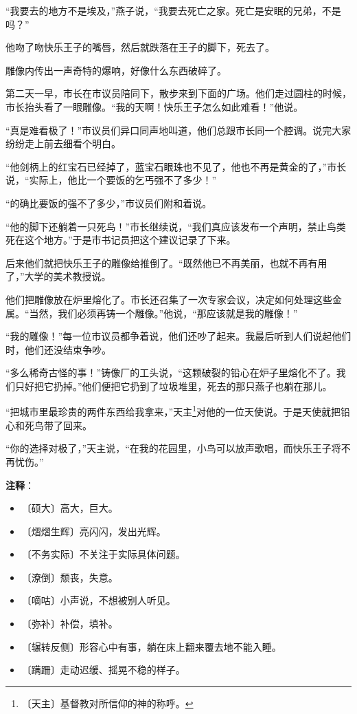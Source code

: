 \documentclass[12pt,UTF-8,openany]{ctexbook}
\begin{document}
\begin{large}
    “我要去的地方不是埃及，”燕子说，“我要去死亡之家。死亡是安眠的兄弟，不是吗？”
    
    他吻了吻快乐王子的嘴唇，然后就跌落在王子的脚下，死去了。
    
    雕像内传出一声奇特的爆响，好像什么东西破碎了。
    
    第二天一早，市长在市议员陪同下，散步来到下面的广场。他们走过圆柱的时候，市长抬头看了一眼雕像。“我的天啊！快乐王子怎么如此难看！”他说。
    
    “真是难看极了！”市议员们异口同声地叫道，他们总跟市长同一个腔调。说完大家纷纷走上前去细看个明白。
    
    “他剑柄上的红宝石已经掉了，蓝宝石眼珠也不见了，他也不再是黄金的了，”市长说，“实际上，他比一个要饭的乞丐强不了多少！”
    
    “的确比要饭的强不了多少，”市议员们附和着说。
    
    “他的脚下还躺着一只死鸟！”市长继续说，“我们真应该发布一个声明，禁止鸟类死在这个地方。”于是市书记员把这个建议记录了下来。
    
    后来他们就把快乐王子的雕像给推倒了。“既然他已不再美丽，也就不再有用了，”大学的美术教授说。
    
    他们把雕像放在炉里熔化了。市长还召集了一次专家会议，决定如何处理这些金属。“当然，我们必须再铸一个雕像。”他说，“那应该就是我的雕像！”
    
    “我的雕像！”每一位市议员都争着说，他们还吵了起来。我最后听到人们说起他们时，他们还没结束争吵。
    
    “多么稀奇古怪的事！”铸像厂的工头说，“这颗破裂的铅心在炉子里熔化不了。我们只好把它扔掉。”他们便把它扔到了垃圾堆里，死去的那只燕子也躺在那儿。
    
    “把城市里最珍贵的两件东西给我拿来，”天主\footnote{〔天主〕基督教对所信仰的神的称呼。}对他的一位天使说。于是天使就把铅心和死鸟带了回来。
    
    “你的选择对极了，”天主说，“在我的花园里，小鸟可以放声歌唱，而快乐王子将不再忧伤。”
    
\end{large}


\newpage

\textbf{注释}：

\vspace{-1em}

\begin{itemize}
    \setlength\itemsep{-0.2em}
    \item 〔硕大〕高大，巨大。
    \item 〔熠熠生辉〕亮闪闪，发出光辉。
    \item 〔不务实际〕不关注于实际具体问题。
    \item 〔潦倒〕颓丧，失意。
    \item 〔嘀咕〕小声说，不想被别人听见。
    \item 〔弥补〕补偿，填补。
    \item 〔辗转反侧〕形容心中有事，躺在床上翻来覆去地不能入睡。
    \item 〔蹒跚〕走动迟缓、摇晃不稳的样子。
\end{itemize}
\end{document}
